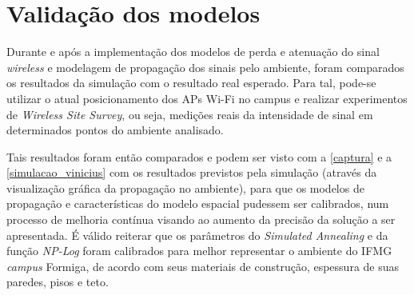 \documentclass[
	12pt,				%
	twoside,			%
	a4paper,			%
	english,			%
	french,				%
	spanish,			%
	brazil				%
	]{abntex2}
\begin{document}
\section{Validação dos modelos}\label{validauxe7uxe3o-dos-modelos}

Durante e após a implementação dos modelos de perda e atenuação do sinal
\emph{wireless} e modelagem de propagação dos sinais pelo ambiente,
foram comparados os resultados da simulação com o resultado real
esperado. Para tal, pode-se utilizar o atual posicionamento dos APs
Wi-Fi no campus e realizar experimentos de \emph{Wireless Site Survey},
ou seja, medições reais da intensidade de sinal em determinados pontos
do ambiente analisado.

Tais resultados foram então comparados e podem ser visto com a
\autoref{captura} e a \autoref{simulacao_vinicius} com os resultados
previstos pela simulação (através da visualização gráfica da propagação
no ambiente), para que os modelos de propagação e características do
modelo espacial pudessem ser calibrados, num processo de melhoria
contínua visando ao aumento da precisão da solução a ser apresentada. É
válido reiterar que os parâmetros do \emph{Simulated Annealing} e da
função \emph{NP-Log} foram calibrados para melhor representar o ambiente
do IFMG \emph{campus} Formiga, de acordo com seus materiais de
construção, espessura de suas paredes, pisos e teto.
\end{document}
